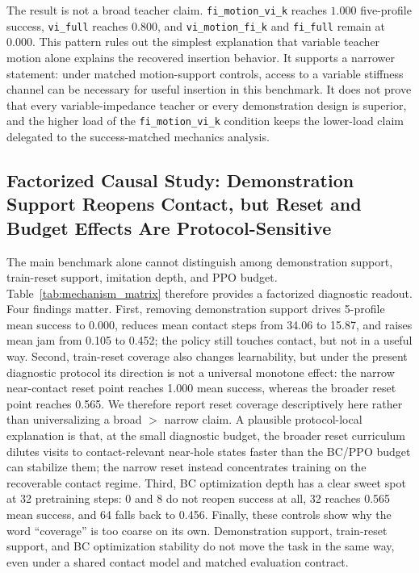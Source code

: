 ﻿\documentclass[11pt]{article}
\newcommand{\code}[1]{\nolinkurl{#1}}
\begin{document}
The result is not a broad teacher claim. \code{fi\_motion\_vi\_k} reaches $1.000$ five-profile success, \code{vi\_full} reaches $0.800$, and \code{vi\_motion\_fi\_k} and \code{fi\_full} remain at $0.000$. This pattern rules out the simplest explanation that variable
teacher motion alone explains the recovered insertion behavior. It supports a narrower statement:
under matched motion-support controls, access to a variable stiffness channel can be necessary for
useful insertion in this benchmark. It does not prove that every variable-impedance teacher or every
demonstration design is superior, and the higher load of the \code{fi\_motion\_vi\_k} condition
keeps the lower-load claim delegated to the success-matched mechanics analysis.

\subsection{Factorized Causal Study: Demonstration Support Reopens Contact, but Reset and Budget Effects Are Protocol-Sensitive}
\label{sec:coverage}

The main benchmark alone cannot distinguish among demonstration support, train-reset support,
imitation depth, and PPO budget. Table~\ref{tab:mechanism_matrix} therefore provides a
factorized diagnostic readout. Four findings matter.
First, removing demonstration support drives 5-profile mean success to 0.000, reduces mean
contact steps from 34.06 to 15.87, and raises mean jam from 0.105 to 0.452; the policy still
touches contact, but not in a useful way. Second, train-reset coverage also changes learnability,
but under the present diagnostic protocol its direction is not a universal monotone effect: the
narrow near-contact reset point reaches 1.000 mean success, whereas the broader reset point reaches
0.565. We therefore report reset coverage descriptively here rather than universalizing a broad
$>$ narrow claim. A plausible protocol-local explanation is that, at the small diagnostic budget,
the broader reset curriculum dilutes visits to contact-relevant near-hole states faster than the
BC/PPO budget can stabilize them; the narrow reset instead concentrates training on the recoverable
contact regime. Third, BC optimization depth has a clear sweet spot at 32 pretraining steps:
0 and 8 do not reopen success at all, 32 reaches 0.565 mean success, and 64 falls back to 0.456.
Finally, these controls show why the word ``coverage'' is too coarse on its own.
Demonstration support, train-reset support, and BC optimization stability do not move the task in
the same way, even under a shared contact model and matched evaluation contract.
\end{document}
